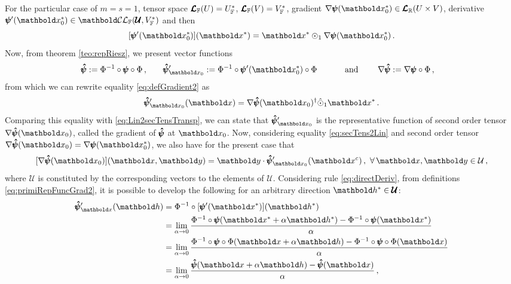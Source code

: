  For the particular case of $m=s=1$, tensor space $\pmb{\mathcal{L}}_{\mathbb{F}}(U)=U^*_{\mathbb{F}}$, $\pmb{\mathcal{L}}_{\mathbb{F}}(V)=V^*_{\mathbb{F}}$, gradient $\fua{\nabla\tnr{\psi}}{\vto{x}_0^*}\in\ete{\cam{R}}{U\times V}$, derivative $\fua{\tnr{\psi}'}{\vto{x}_0^*}\in\evlc{\cam{F}}{\pmb{\mathcal{U}}}{V^*_\cam{F}}$ and then
\begin{equation}\label{eq:defGradient2}
[\fua{\tnr{\psi}'}{\vto{x}_0^*}](\vto{x}^*) = \vto{x}^*\odot_1\fua{\nabla\tnr{\psi}}{\vto{x}_0^*}\,.
\end{equation}
Now, from theorem \ref{teo:repRiesz}, we present vector functions
\begin{alignat}{4} \label{eq:primiRepFuncGrad2}
\tnr{\hat{\psi}}:=\Phi^{-1}\circ\tnr{\psi}\circ\Phi\,, &\qquad   \tnr{\hat{\psi}}'_{\vto{x}_0}:=\Phi^{-1}\circ\fua{\tnr{\psi}'}{\vto{x}_0^*}\circ\Phi  &\qquad \text{ and } \qquad& \nabla\tnr{\hat{\psi}}:=\nabla\tnr{\psi}\circ\Phi \,,
\end{alignat}
from which we can rewrite equality \eqref{eq:defGradient2} as
\begin{equation}\label{eq:derivVecGradVec}
\fua{\tnr{\hat\psi}'_{\vto{x}_0}}{\vto{x}} = \fua{ \nabla\tnr{\hat{\psi}}}{\vto{x}_0}^\dagger\hat{\odot}_1\vto{x}^*\,.
\end{equation}
Comparing this equality with \eqref{eq:Lin2secTensTransp}, we can state that $\tnr{\hat\psi}'_{\vto{x}_0}$ is the representative function of second order tensor $\fua{ \nabla\tnr{\hat{\psi}}}{\vto{x}_0}$, called the gradient of  $\pmb{\hat{\psi}}$ at $\vto{x}_0$. Now, considering equality \eqref{eq:secTens2Lin} and second order tensor $\fua{\nabla\tnr{\hat{\psi}}}{\vto{x}_0}=\fua{\nabla\tnr{\psi}}{\vto{x}_0^*}$, we also have for the present case that 
\begin{equation}\label{eq:gradFuncRep}
\fua{[\fua{\nabla\tnr{\hat{\psi}}}{\vto{x}_0}]}{\vto{x},\vto{y}}=\vto{y}\cdot\fua{\tnr{\hat\psi}'_{\vto{x}_0}}{\vto{x}^{c}}\,,\,\,\forall\, \vto{x},\vto{y}\in\mathcal{U}\,,
\end{equation}
where $\mathcal{U}$ is constituted by the corresponding vectors to the elements of $\pmb{\mathcal{U}}$. Considering rule \eqref{eq:directDeriv}, from  definitions \eqref{eq:primiRepFuncGrad2}, it is possible to develop the following for an arbitrary direction $\vto{h}^*\in\pmb{\mathcal{U}}$:  
\begin{align}\label{eq:derivRep}
\fua{\tnr{\hat\psi}'_{\vto{x}}}{\vto{h}}&=\Phi^{-1}\circ\fua{[\fua{\tnr{\psi}'}{\vto{x}^*}]}{\vto{h}^*}\nonumber\\
&=\lim_{\alpha\to 0} \dfrac{\fua{\Phi^{-1}\circ\tnr{\psi}}{\vto{x}^*+\alpha\vto{h}^*}-\fua{\Phi^{-1}\circ\tnr{\psi}}{\vto{x}^*}}{\alpha}\nonumber\\
&=\lim_{\alpha\to 0} \dfrac{\fua{\Phi^{-1}\circ\tnr{\psi}\circ\Phi}{\vto{x}+\alpha\vto{h}}-\fua{\Phi^{-1}\circ\tnr{\psi}\circ\Phi}{\vto{x}}}{\alpha}\nonumber\\
&=\lim_{\alpha\to 0} \dfrac{\fua{\tnr{\hat\psi}}{\vto{x}+\alpha\vto{h}}-\fua{\tnr{\hat\psi}}{\vto{x}}}{\alpha}\,,
\end{align}
